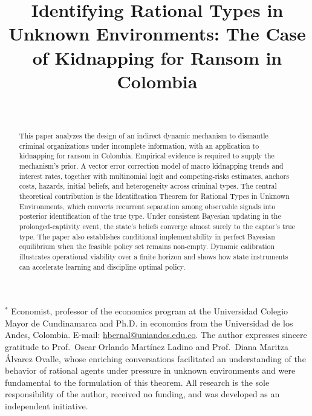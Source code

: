 \documentclass[ecta,nameyear,draft]{econsocart}
\theoremstyle{plain}
\theoremstyle{definition}
\newcommand{\1}{\mathbf{1}}
\begin{document}
\begin{frontmatter}

\title{Identifying Rational Types in Unknown Environments: The Case of Kidnapping for Ransom in Colombia}

\begin{aug}
\author[add1,add2]{~}
\address[add1]{%
,
}
\address[add2]{%
,
}
\end{aug}

\begin{funding}
$^*$ Economist, professor of the economics program at the Universidad Colegio Mayor de Cundinamarca and Ph.D. in economics from the Universidad de los Andes, Colombia. E-mail: \href{mailto:hbernal@uniandes.edu.co}{hbernal@uniandes.edu.co}. The author expresses sincere gratitude to Prof.\ Oscar Orlando Mart\'inez Ladino and Prof.\ Diana Maritza \'Alvarez Ovalle, whose enriching conversations facilitated an understanding of the behavior of rational agents under pressure in unknown environments and were fundamental to the formulation of this theorem. All research is the sole responsibility of the author, received no funding, and was developed as an independent initiative.
\end{funding}

\begin{abstract}
This paper analyzes the design of an indirect dynamic mechanism to dismantle criminal organizations under incomplete information, with an application to kidnapping for ransom in Colombia. Empirical evidence is required to supply the mechanism's prior. A vector error correction model of macro kidnapping trends and interest rates, together with multinomial logit and competing-risks estimates, anchors costs, hazards, initial beliefs, and heterogeneity across criminal types. The central theoretical contribution is the Identification Theorem for Rational Types in Unknown Environments, which converts recurrent separation among observable signals into posterior identification of the true type. Under consistent Bayesian updating in the prolonged-captivity event, the state's beliefs converge almost surely to the captor's true type. The paper also establishes conditional implementability in perfect Bayesian equilibrium when the feasible policy set remains non-empty. Dynamic calibration illustrates operational viability over a finite horizon and shows how state instruments can accelerate learning and discipline optimal policy.
\end{abstract}


\end{frontmatter}
\end{document}
